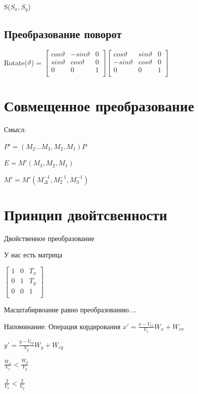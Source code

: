 \documentclass{article}
\begin{document}
S($S_x,S_y$) 

\subsection{Преобразование поворот}

Rotate($\vartheta$) = 
$\begin{bmatrix}
    cos \vartheta & -sin \vartheta  & 0 \\[0.3em]
    sin \vartheta &  cos \vartheta  & 0 \\[0.3em]
    0 & 0  & 1 \\[0.3em]
\end{bmatrix}
\begin{bmatrix}
    cos \vartheta & sin \vartheta  & 0 \\[0.3em]
    -sin \vartheta &  cos \vartheta  & 0 \\[0.3em]
    0 & 0  & 1 \\[0.3em]
\end{bmatrix}$


\section{Совмещенное преобразование}

Смысл:

$P' = (M_2...M_3,M_2,M_1)P$

$E = M' (M_3,M_2,M_1)$

$M' = M' (M_{\Delta }^{-1}, M_{2}^{-1},M_{3}^{-1})$


\section{Принцип двойтсвенности}
Двойственное преобразование

У нас есть матрица

$\begin{bmatrix}
    1 & 0 & T_x \\
    0 & 1 & T_y \\
    0 & 0 & 1 \\
\end{bmatrix}$

Масштабирвоание равно преобразованию....


Напоминание: Операция кордирования $x' = \frac{x-V_{cx}}{V_x} W_x + W_{cx}$

$y' = \frac{y-V_{cy}}{V_y} W_y + W_{cy}$

$\frac{W_x}{V_x} < \frac{W_y}{V_y}$


$\frac{2}{V_x} < \frac{2}{V_y}$
\end{document}
